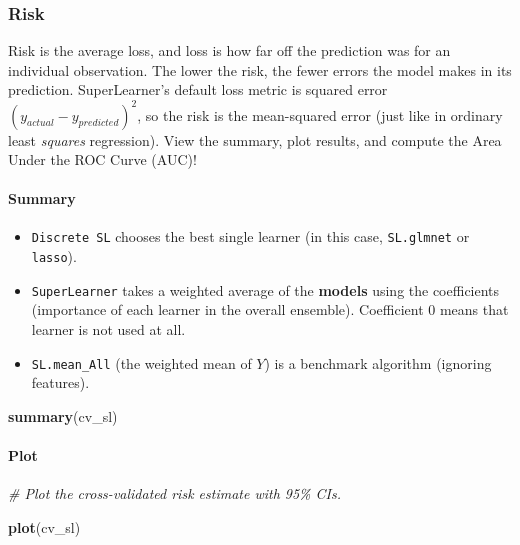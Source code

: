 \documentclass[
]{book}
\newenvironment{Shaded}{\begin{snugshade}}{\end{snugshade}}
\newcommand{\CommentTok}[1]{\textcolor[rgb]{0.56,0.35,0.01}{\textit{#1}}}
\newcommand{\FunctionTok}[1]{\textcolor[rgb]{0.13,0.29,0.53}{\textbf{#1}}}
\newcommand{\NormalTok}[1]{#1}
\providecommand{\tightlist}{%
  \setlength{\itemsep}{0pt}\setlength{\parskip}{0pt}}
\begin{document}
\subsubsection{Risk}\label{risk}

Risk is the average loss, and loss is how far off the prediction was for an individual observation. The lower the risk, the fewer errors the model makes in its prediction. SuperLearner's default loss metric is squared error \((y_{actual} - y_{predicted})^2\), so the risk is the mean-squared error (just like in ordinary least \emph{squares} regression). View the summary, plot results, and compute the Area Under the ROC Curve (AUC)!

\paragraph{Summary}\label{summary}

\begin{itemize}
\tightlist
\item
  \texttt{Discrete\ SL} chooses the best single learner (in this case, \texttt{SL.glmnet} or \texttt{lasso}).
\item
  \texttt{SuperLearner} takes a weighted average of the \textbf{models} using the coefficients (importance of each learner in the overall ensemble). Coefficient 0 means that learner is not used at all.
\item
  \texttt{SL.mean\_All} (the weighted mean of \(Y\)) is a benchmark algorithm (ignoring features).
\end{itemize}

\begin{Shaded}
\begin{Highlighting}[]
\FunctionTok{summary}\NormalTok{(cv\_sl)}
\end{Highlighting}
\end{Shaded}

\paragraph{Plot}\label{plot}

\begin{Shaded}
\begin{Highlighting}[]
\CommentTok{\# Plot the cross{-}validated risk estimate with 95\% CIs.}

\FunctionTok{plot}\NormalTok{(cv\_sl)}
\end{Highlighting}
\end{Shaded}
\end{document}
